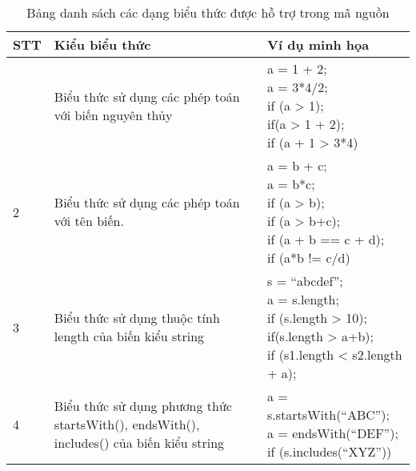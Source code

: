 \vspace{-1cm}
\setcounter{table}{0}
\renewcommand{\thetable}{A.\arabic{table}}
\setlength\LTleft{0pt}
\setlength\LTright{0pt}
\setlength\LTcapwidth{\linewidth}
\begin{longtable}{ |p{1cm}|p{7cm}|p{}|}
    \caption{Bảng danh sách các dạng biểu thức được hỗ trợ trong mã nguồn}
    \\
         \hline
         \textbf{STT} & \textbf{Kiểu biểu thức} & \textbf{Ví dụ minh họa}\\
         \hline
         \endhead
         \hline
         \endfoot
        1 & Biểu thức sử dụng các phép toán với biến nguyên thủy & \makecell[l]{ a = 1 + 2;\\
         a = 3*4/2;\\
        if (a > 1);\\ if(a > 1 + 2); \\
        if (a + 1 > 3*4)} 
        \\
        \hline
        2 & Biểu thức sử dụng các phép toán với tên biến.   & \makecell[l]{ a = b + c;\\ a = b*c;\\
        if (a > b); \\if (a > b+c); \\
        if (a + b ==  c + d); \\
        if (a*b != c/d)}
        \\
        \hline
        3 & Biểu thức sử dụng thuộc tính length của biến kiểu string & \makecell[l]{ s = “abcdef”;\\
        a = s.length;\\
        if (s.length > 10);\\
        if(s.length > a+b); \\
        if (s1.length < s2.length + a);}
        \\
        \hline
        4 & Biểu thức sử dụng phương thức startsWith(), endsWith(), includes() của biến kiểu string & \makecell[l]{ a = s.startsWith(“ABC”); \\
        a = endsWith(“DEF”);\\
        if (s.includes(“XYZ”))}

\end{longtable}
